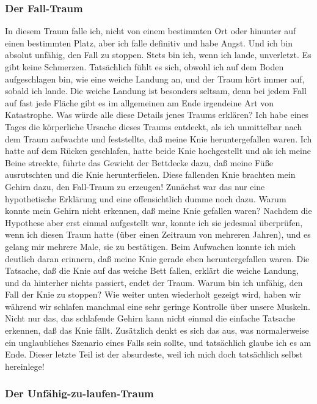 \subsubsection{Der Fall-Traum}
\label{c3_5b}

In diesem Traum falle ich, nicht von einem bestimmten Ort oder hinunter auf einen bestimmten Platz, aber ich falle definitiv und habe Angst.
Und ich bin absolut unfähig, den Fall zu stoppen.
Stets bin ich, wenn ich lande, unverletzt.
Es gibt keine Schmerzen.
Tatsächlich fühlt es sich, obwohl ich auf dem Boden aufgeschlagen bin, wie eine weiche Landung an, und der Traum hört immer auf, sobald ich lande.
Die weiche Landung ist besonders seltsam, denn bei jedem Fall auf fast jede Fläche gibt es im allgemeinen am Ende irgendeine Art von Katastrophe.
Was würde alle diese Details jenes Traums erklären?
Ich habe eines Tages die körperliche Ursache dieses Traums entdeckt, als ich unmittelbar nach dem Traum aufwachte und feststellte, daß meine Knie heruntergefallen waren.
Ich hatte auf dem Rücken geschlafen, hatte beide Knie hochgestellt und als ich meine Beine streckte, führte das Gewicht der Bettdecke dazu, daß meine Füße ausrutschten und die Knie herunterfielen.
Diese fallenden Knie brachten mein Gehirn dazu, den Fall-Traum zu erzeugen!
Zunächst war das nur eine hypothetische Erklärung und eine offensichtlich dumme noch dazu.
Warum konnte mein Gehirn nicht erkennen, daß meine Knie gefallen waren?
Nachdem die Hypothese aber erst einmal aufgestellt war, konnte ich sie jedesmal überprüfen, wenn ich diesen Traum hatte (über einen Zeitraum von mehreren Jahren), und es gelang mir mehrere Male, sie zu bestätigen.
Beim Aufwachen konnte ich mich deutlich daran erinnern, daß meine Knie gerade eben heruntergefallen waren.
Die Tatsache, daß die Knie auf das weiche Bett fallen, erklärt die weiche Landung, und da hinterher nichts passiert, endet der Traum.
Warum bin ich unfähig, den Fall der Knie zu stoppen?
Wie weiter unten wiederholt gezeigt wird, haben wir während wir schlafen manchmal eine sehr geringe Kontrolle über unsere Muskeln.
Nicht nur das, das schlafende Gehirn kann nicht einmal die einfache Tatsache erkennen, daß das Knie fällt.
Zusätzlich denkt es sich das aus, was normalerweise ein unglaubliches Szenario eines Falls sein sollte, und tatsächlich glaube ich es am Ende.
Dieser letzte Teil ist der absurdeste, weil ich mich doch tatsächlich selbst hereinlege!


\subsubsection{Der Unfähig-zu-laufen-Traum}
\label{c3_5c}


